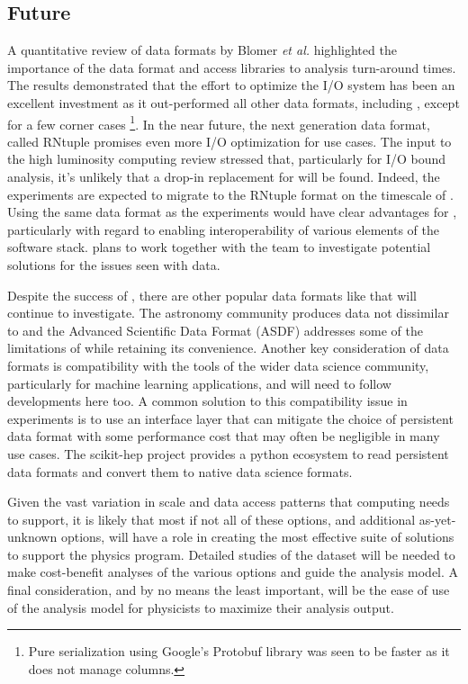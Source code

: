\documentclass[../main-v1.tex]{subfiles}
\begin{document}
\subsection{Future }
A quantitative review of data formats by Blomer {\it et al.}\cite{Blomer:2018icl} 
highlighted the importance of the data format and access libraries to analysis turn-around times.  The results demonstrated that the effort to optimize the  I/O system has been an excellent investment as it out-performed all other data formats, including , except for a few corner cases
\footnote{Pure serialization using Google's Protobuf library was seen to be faster as it does not manage columns.}.
In the near future, the next generation  data format, called RNtuple 
\cite{Blomer:2020usr, ROOTTeam:2020jal} promises even more I/O optimization for  use cases.  The  input to the high luminosity  computing review \cite{HEPSoftwareFoundation:2020daq} stressed that, particularly for I/O bound analysis, it's unlikely that a drop-in replacement for  will be found.
Indeed, the  experiments are expected to migrate to the RNtuple format on the timescale of .  Using the same data format as the  experiments would have clear advantages for , particularly with regard to enabling interoperability of various elements of the software stack.  plans to work together with the  team to investigate potential solutions for the issues seen with  data.

Despite the success of , there are other popular data formats like  that  will continue to investigate.  The astronomy community produces data not dissimilar to  and the Advanced Scientific Data Format (ASDF) addresses some of the limitations of  while retaining its convenience. Another key consideration of data formats is compatibility with the tools of the wider data science community, particularly for machine learning applications, and  will need to follow developments here too.  A common solution to this compatibility issue in  experiments is to use an interface layer that can mitigate the choice of persistent data format with some performance cost that may often be negligible in many use cases.  The scikit-hep project\cite{Rodrigues:2019nct} provides a python ecosystem to read  persistent data formats and convert them to native data science formats.

Given the vast variation in scale and data access patterns that  computing needs to support, it is likely that most if not all of these options, and additional as-yet-unknown options, will have a role in creating the most effective suite of solutions to support the physics program. Detailed studies of the  dataset will be needed to make cost-benefit analyses of the various options and guide the analysis model.  A final consideration, and by no means the least important, will be the ease of use of the analysis model for physicists to maximize their analysis output.
\end{document}
